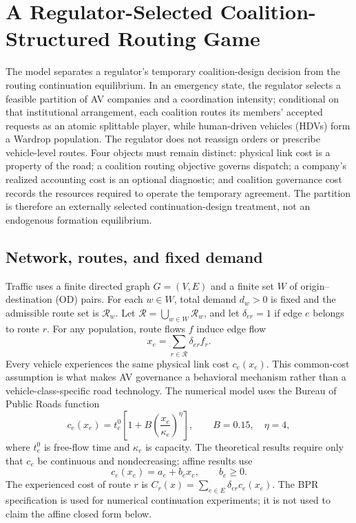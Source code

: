 \section{A Regulator-Selected Coalition-Structured Routing Game}\label{sec:model}

The model separates a regulator's temporary coalition-design decision from the routing continuation equilibrium. In an emergency state, the regulator selects a feasible partition of AV companies and a coordination intensity; conditional on that institutional arrangement, each coalition routes its members' accepted requests as an atomic splittable player, while human-driven vehicles (HDVs) form a Wardrop population. The regulator does not reassign orders or prescribe vehicle-level routes. Four objects must remain distinct: physical link cost is a property of the road; a coalition routing objective governs dispatch; a company's realized accounting cost is an optional diagnostic; and coalition governance cost records the resources required to operate the temporary agreement. The partition is therefore an externally selected continuation-design treatment, not an endogenous formation equilibrium.

\subsection{Network, routes, and fixed demand}\label{sec:model_network}

Traffic uses a finite directed graph $G=(V,E)$ and a finite set $W$ of origin--destination (OD) pairs. For each $w\in W$, total demand $d_w>0$ is fixed and the admissible route set is $\mathcal R_w$. Let $\mathcal R=\bigcup_{w\in W}\mathcal R_w$, and let $\delta_{er}=1$ if edge $e$ belongs to route $r$. For any population, route flows $f$ induce edge flow
\begin{equation}\label{eq:route-edge-map}
 x_e=\sum_{r\in\mathcal R}\delta_{er}f_r.
\end{equation}
Every vehicle experiences the same physical link cost $c_e(x_e)$. This common-cost assumption is what makes AV governance a behavioral mechanism rather than a vehicle-class-specific road technology. The numerical model uses the Bureau of Public Roads function
\begin{equation}\label{eq:bpr}
 c_e(x_e)=t_e^0\left[1+B\left(\frac{x_e}{\kappa_e}\right)^\eta\right],
 \qquad B=0.15,\quad \eta=4,
\end{equation}
where $t_e^0$ is free-flow time and $\kappa_e$ is capacity. The theoretical results require only that $c_e$ be continuous and nondecreasing; affine results use
\begin{equation}\label{eq:affine}
 c_e(x_e)=a_e+b_ex_e,\qquad b_e\geq0.
\end{equation}
The experienced cost of route $r$ is $C_r(x)=\sum_{e\in E}\delta_{er}c_e(x_e)$. The BPR specification is used for numerical continuation experiments; it is not used to claim the affine closed form below.

